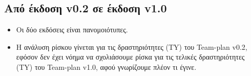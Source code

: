\documentclass[12pt,a4paper]{article}
\begin{document}
\subsection{Από έκδοση v0.2 σε έκδοση v1.0}
\begin{itemize}
    \item Οι δύο εκδόσεις είναι πανομοιότυπες. 
    \item Η ανάλυση ρίσκου γίνεται για τις δραστηριότητες (TY) του Team-plan v0.2, εφόσον δεν έχει νόημα να σχολιάσουμε ρίσκα για τις τελικές δραστηριότητες (TY) του Team-plan v1.0, αφού γνωρίζουμε πλέον τι έγινε.
\end{itemize}
\end{document}

